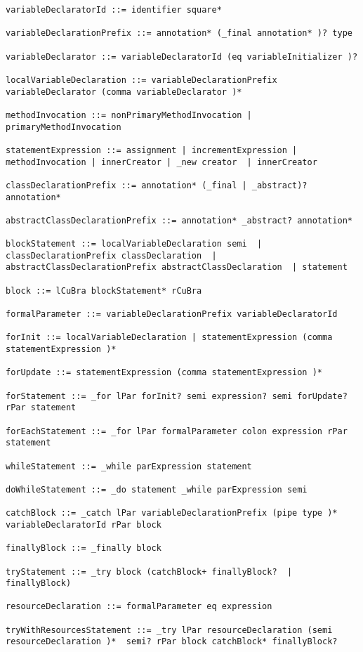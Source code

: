 \begin{lstlisting}[breaklines=true]
variableDeclaratorId ::= identifier square*

variableDeclarationPrefix ::= annotation* (_final annotation* )? type

variableDeclarator ::= variableDeclaratorId (eq variableInitializer )?

localVariableDeclaration ::= variableDeclarationPrefix variableDeclarator (comma variableDeclarator )*

methodInvocation ::= nonPrimaryMethodInvocation | primaryMethodInvocation

statementExpression ::= assignment | incrementExpression | methodInvocation | innerCreator | _new creator  | innerCreator

classDeclarationPrefix ::= annotation* (_final | _abstract)? annotation*

abstractClassDeclarationPrefix ::= annotation* _abstract? annotation*

blockStatement ::= localVariableDeclaration semi  | classDeclarationPrefix classDeclaration  | abstractClassDeclarationPrefix abstractClassDeclaration  | statement

block ::= lCuBra blockStatement* rCuBra

formalParameter ::= variableDeclarationPrefix variableDeclaratorId

forInit ::= localVariableDeclaration | statementExpression (comma statementExpression )*

forUpdate ::= statementExpression (comma statementExpression )*

forStatement ::= _for lPar forInit? semi expression? semi forUpdate? rPar statement

forEachStatement ::= _for lPar formalParameter colon expression rPar statement

whileStatement ::= _while parExpression statement

doWhileStatement ::= _do statement _while parExpression semi

catchBlock ::= _catch lPar variableDeclarationPrefix (pipe type )* variableDeclaratorId rPar block

finallyBlock ::= _finally block

tryStatement ::= _try block (catchBlock+ finallyBlock?  | finallyBlock)

resourceDeclaration ::= formalParameter eq expression

tryWithResourcesStatement ::= _try lPar resourceDeclaration (semi resourceDeclaration )*  semi? rPar block catchBlock* finallyBlock?


\end{lstlisting}
